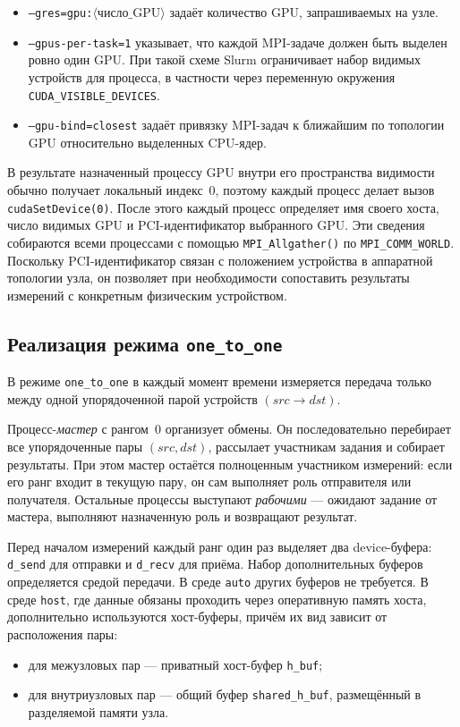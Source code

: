 \documentclass[a4paper,14pt]{extarticle}
\begin{document}
\begin{itemize}[leftmargin=2.1cm, itemsep=0.15em, topsep=0.15em, parsep=0pt, partopsep=0pt]
	\item \texttt{--gres=gpu:}\(\langle\text{число\_GPU}\rangle\) задаёт количество GPU, запрашиваемых на узле.
	
	\item \texttt{--gpus-per-task=1} указывает, что каждой MPI-задаче должен быть выделен ровно один GPU. При такой схеме Slurm ограничивает набор видимых устройств для процесса, в частности через переменную окружения \texttt{CUDA\_VISIBLE\_DEVICES}.
	
	\item \texttt{--gpu-bind=closest} задаёт привязку MPI-задач к ближайшим по топологии GPU относительно выделенных CPU-ядер.
\end{itemize}

В результате назначенный процессу GPU внутри его пространства видимости обычно получает локальный индекс~0, поэтому каждый процесс делает вызов \texttt{cudaSetDevice(0)}. После этого каждый процесс определяет имя своего хоста, число видимых GPU и PCI-идентификатор выбранного GPU. Эти сведения собираются всеми процессами с помощью \texttt{MPI\_Allgather()} по \texttt{MPI\_COMM\_WORLD}. Поскольку PCI-идентификатор связан с положением устройства в аппаратной топологии узла, он позволяет при необходимости сопоставить результаты измерений с конкретным физическим устройством.

\subsection{Реализация режима \texttt{one\_to\_one}}
\label{sec:one-to-one-impl}
 
В режиме \texttt{one\_to\_one} в каждый момент времени измеряется передача только между одной упорядоченной парой устройств \((src \rightarrow dst)\).
 
Процесс-\emph{мастер} с рангом~\(0\) организует обмены. Он последовательно перебирает все упорядоченные пары \((src, dst)\), рассылает участникам задания и собирает результаты. При этом мастер остаётся полноценным участником измерений: если его ранг входит в текущую пару, он сам выполняет роль отправителя или получателя. Остальные процессы выступают \emph{рабочими} --- ожидают задание от мастера, выполняют назначенную роль и возвращают результат.
 
Перед началом измерений каждый ранг один раз выделяет два device-буфера: \texttt{d\_send} для отправки и \texttt{d\_recv} для приёма. Набор дополнительных буферов определяется средой передачи. В среде \texttt{auto} других буферов не требуется. В среде \texttt{host}, где данные обязаны проходить через оперативную память хоста, дополнительно используются хост-буферы, причём их вид зависит от расположения пары:
\begin{itemize}[leftmargin=2.1cm, itemsep=0.15em, topsep=0.15em, parsep=0pt, partopsep=0pt]
	\item для межузловых пар --- приватный хост-буфер \texttt{h\_buf};
	\item для внутриузловых пар --- общий буфер \texttt{shared\_h\_buf}, размещённый в разделяемой памяти узла.
\end{itemize}
 
\end{document}
